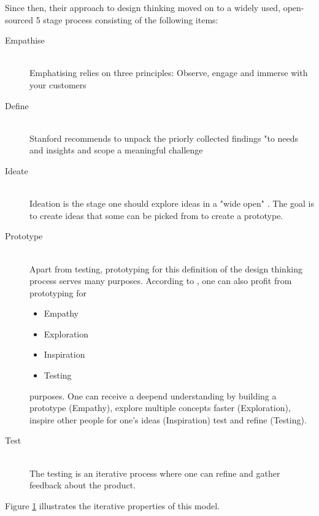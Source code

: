 Since then, their approach to design thinking moved on to a widely used, open-sourced 5 stage process \parencite{designThinkingCrashCourse}
consisting of the following items:
\begin{description}
    \item [Empathise] \hfill \\
    Emphatising relies on three principles: Observe, engage and immerse with your customers
    \item [Define] \hfill \\
    Stanford recommends to unpack the priorly collected findings "to needs and insights and scope a meaningful challenge \parencite{designThinkingBootleg}
    \item [Ideate] \hfill \\
    Ideation is the stage one should explore ideas in a "wide open" \parencite{designThinkingBootleg}. The goal is to create ideas that some 
    can be picked from to create a prototype.
    \item [Prototype] \hfill \\
    Apart from testing, prototyping for this definition of the design thinking process serves many purposes. 
    According to \parencite{designThinkingBootleg}, one can also profit from prototyping for
    \begin{itemize}
        \item Empathy
        \item Exploration
        \item Inspiration
        \item Testing
    \end{itemize}
    purposes. One can receive a deepend understanding by building a prototype (Empathy), explore multiple concepts faster (Exploration),
    inspire other people for one's ideas (Inspiration) test and refine (Testing). 

    \item [Test] \hfill \\
    The testing is an iterative process where one can refine and gather feedback about the product.
\end{description}
Figure \ref{fig:designThinking} illustrates the iterative properties of this model.

\begin{figure}[h]
	\centering
	\caption[designThinking]{}
	\label{fig:designThinking}
  \end{figure}

